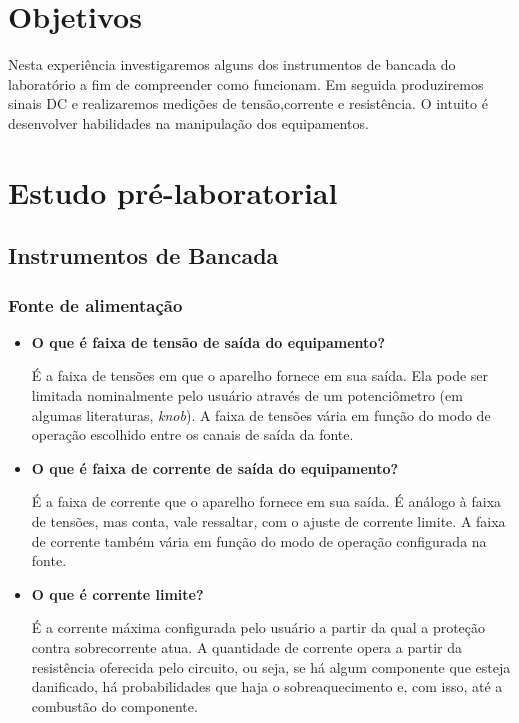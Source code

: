\section{Objetivos}
Nesta experiência investigaremos alguns dos instrumentos de bancada do laboratório a fim de compreender como
funcionam. Em seguida produziremos sinais DC e realizaremos medições de tensão,corrente e resistência. O intuito é desenvolver habilidades na manipulação dos equipamentos.

\section{Estudo pré-laboratorial}

\subsection{Instrumentos de Bancada}

\subsubsection{Fonte de alimentação}

\begin{itemize}
    \item \textbf{O que é faixa de tensão de saída do equipamento?}
        
        É a faixa de tensões em que o aparelho fornece em sua saída. Ela pode ser limitada nominalmente pelo usuário através de um potenciômetro (em algumas literaturas, \textit{knob}). A faixa de tensões vária em função do modo de operação escolhido entre os canais de saída da fonte.

    \item \textbf{O que é faixa de corrente de saída do equipamento?}

        É a faixa de corrente que o aparelho fornece em sua saída. É análogo à faixa de tensões, mas conta, vale ressaltar, com o ajuste de corrente limite. A faixa de corrente também vária em função do modo de operação configurada na fonte.
    \item \textbf{O que é corrente limite?}

        É a corrente máxima configurada pelo usuário a partir da qual a proteção contra sobrecorrente atua. A quantidade de corrente opera a partir da resistência oferecida pelo circuito, ou seja, se há algum componente que esteja danificado, há probabilidades que haja o sobreaquecimento e, com isso, até a combustão do componente.
\end{itemize}

